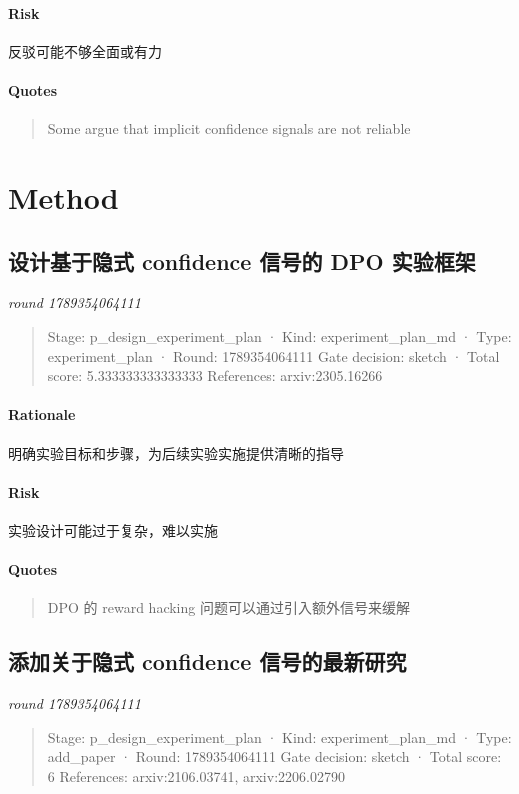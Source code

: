 \documentclass{article}
\begin{document}
\paragraph{Risk}

反驳可能不够全面或有力

\paragraph{Quotes}
\begin{quote}
Some argue that implicit confidence signals are not reliable
\end{quote}

\section{Method}
\subsection{设计基于隐式 confidence 信号的 DPO 实验框架}
\textit{round 1789354064111}\\
\begin{quote}
Stage: p\_design\_experiment\_plan  ·  Kind: experiment\_plan\_md  ·  Type: experiment\_plan  ·  Round: 1789354064111
Gate decision: sketch  ·  Total score: 5.333333333333333
References: arxiv:2305.16266
\end{quote}

\paragraph{Rationale}

明确实验目标和步骤，为后续实验实施提供清晰的指导

\paragraph{Risk}

实验设计可能过于复杂，难以实施

\paragraph{Quotes}
\begin{quote}
DPO 的 reward hacking 问题可以通过引入额外信号来缓解
\end{quote}

\subsection{添加关于隐式 confidence 信号的最新研究}
\textit{round 1789354064111}\\
\begin{quote}
Stage: p\_design\_experiment\_plan  ·  Kind: experiment\_plan\_md  ·  Type: add\_paper  ·  Round: 1789354064111
Gate decision: sketch  ·  Total score: 6
References: arxiv:2106.03741, arxiv:2206.02790
\end{quote}
\end{document}
